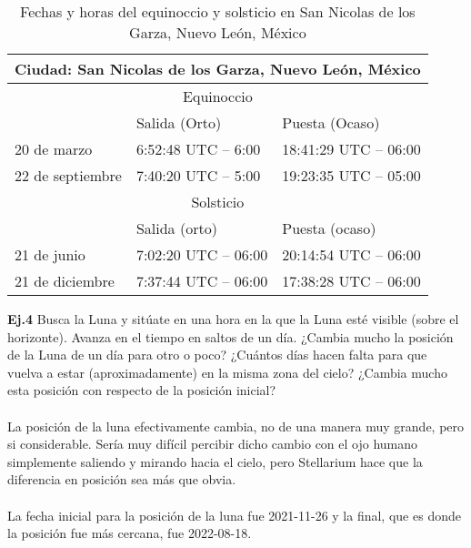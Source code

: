 \documentclass[12pt,letterpaper]{article}
\begin{document}
\begin{table}[H]
\centering
\begin{tabular}{|lll|}
\hline
\multicolumn{3}{|c|}{Ciudad: San Nicolas de los Garza, Nuevo León, México}                                \\ \hline
\multicolumn{3}{|c|}{Equinoccio}                                                                          \\ \hline
\multicolumn{1}{|l|}{}                  & \multicolumn{1}{l|}{Salida (Orto)}       & Puesta (Ocaso)       \\ \hline
\multicolumn{1}{|l|}{20 de marzo}       & \multicolumn{1}{l|}{6:52:48 UTC – 6:00}  & 18:41:29 UTC – 06:00 \\ \hline
\multicolumn{1}{|l|}{22 de septiembre}  & \multicolumn{1}{l|}{7:40:20 UTC – 5:00}  & 19:23:35 UTC – 05:00 \\ \hline
\multicolumn{3}{|c|}{Solsticio}                                                                           \\ \hline
\multicolumn{1}{|l|}{}                  & \multicolumn{1}{l|}{Salida (orto)}       & Puesta (ocaso)       \\ \hline
\multicolumn{1}{|l|}{21 de junio}       & \multicolumn{1}{l|}{7:02:20 UTC – 06:00} & 20:14:54 UTC – 06:00 \\ \hline
\multicolumn{1}{|l|}{21 de   diciembre} & \multicolumn{1}{l|}{7:37:44 UTC – 06:00} & 17:38:28 UTC – 06:00 \\ \hline
\end{tabular}
\caption{Fechas y horas del equinoccio y solsticio en San Nicolas de los Garza, Nuevo León, México}
\end{table}
\textbf{Ej.4} Busca la Luna y sitúate en una hora en la que la Luna esté visible (sobre el horizonte). Avanza en el tiempo en saltos de un día. ¿Cambia mucho la posición de la Luna de un día para otro o poco? ¿Cuántos días hacen falta para que vuelva a estar (aproximadamente) en la misma zona del cielo? ¿Cambia mucho esta posición con respecto de la posición inicial?\\\\
La posición de la luna efectivamente cambia, no de una manera muy grande, pero si considerable. Sería muy difícil percibir dicho cambio con el ojo humano simplemente saliendo y mirando hacia el cielo, pero Stellarium hace que la diferencia en posición sea más que obvia.\\\\
La fecha inicial para la posición de la luna fue 2021-11-26 y la final, que es donde la posición fue más cercana, fue 2022-08-18.
\end{document}
